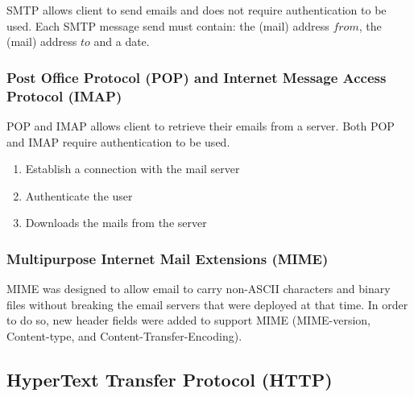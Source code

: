 SMTP allows client to send emails and does not require authentication to be used. Each SMTP message send must contain: the (mail) address $from$, the (mail) address $to$ and a date.

\subsubsection{Post Office Protocol (POP) and Internet Message Access Protocol (IMAP)}

POP and IMAP allows client to retrieve their emails from a server. Both POP and IMAP require authentication to be used.

\begin{enumerate}
\item Establish a connection with the mail server
\item Authenticate the user
\item Downloads the mails from the server
\end{enumerate}

\subsubsection{Multipurpose Internet Mail Extensions (MIME)}

MIME was designed to allow email to carry non-ASCII characters and binary files without breaking the email servers that were deployed at that time. In order to do so, new header fields were added to support MIME (MIME-version, Content-type, and Content-Transfer-Encoding).

\subsection{HyperText Transfer Protocol (HTTP)}

